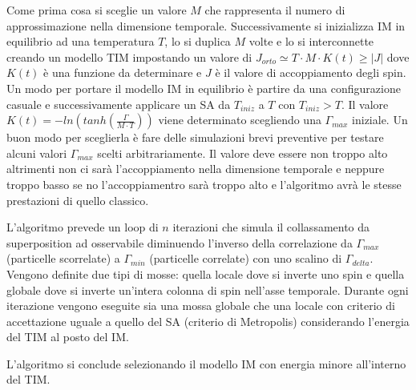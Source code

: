 \cite{PIMC}Come prima cosa si sceglie un valore $M$ che rappresenta il numero di approssimazione nella dimensione temporale.
Successivamente si inizializza IM in equilibrio ad una temperatura $T$, lo si duplica $M$ volte e lo si interconnette creando un modello TIM impostando un valore di $J_{orto} \simeq T \cdot M \cdot K(t) \ge |J|$ dove $K(t)$ è una funzione da determinare e $J$ è il valore di accoppiamento degli spin. Un modo per portare il modello IM in equilibrio è partire da una configurazione casuale e successivamente applicare un SA da $T_{iniz}$ a $T$ con $T_{iniz} > T$.
Il valore $K(t) = -ln(tanh(\frac{\Gamma}{M \cdot T}))$ viene determinato scegliendo una $\Gamma_{max}$ iniziale. Un buon modo per sceglierla è fare delle simulazioni brevi preventive per testare alcuni valori $\Gamma_{max}$ scelti arbitrariamente. Il valore deve essere non troppo alto altrimenti non ci sarà l'accoppiamento nella dimensione temporale e neppure troppo basso se no l'accoppiamentro sarà troppo alto e l'algoritmo avrà le stesse prestazioni di quello classico.

L'algoritmo prevede un loop di $n$ iterazioni che simula il collassamento da superposition ad osservabile diminuendo l'inverso della correlazione da $\Gamma_{max}$ (particelle scorrelate) a $\Gamma_{min}$ (particelle correlate) con uno scalino di $\Gamma_{delta}$.
Vengono definite due tipi di mosse: quella locale dove si inverte uno spin e quella globale dove si inverte un'intera colonna di spin nell'asse temporale.
Durante ogni iterazione vengono eseguite sia una mossa globale che una locale con criterio di accettazione uguale a quello del SA (criterio di Metropolis) considerando l'energia del TIM al posto del IM.

L'algoritmo si conclude selezionando il modello IM con energia minore all'interno del TIM.

